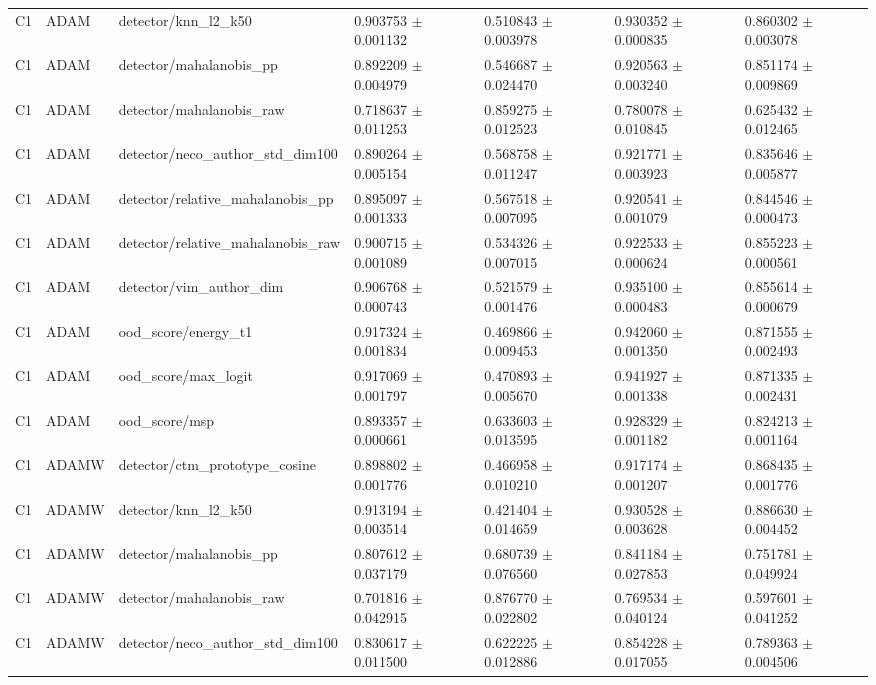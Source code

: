 \begin{longtable}{lllllll}
C1 & ADAM & detector/knn\_l2\_k50 & 0.903753 $\pm$ 0.001132 & 0.510843 $\pm$ 0.003978 & 0.930352 $\pm$ 0.000835 & 0.860302 $\pm$ 0.003078 \\
C1 & ADAM & detector/mahalanobis\_pp & 0.892209 $\pm$ 0.004979 & 0.546687 $\pm$ 0.024470 & 0.920563 $\pm$ 0.003240 & 0.851174 $\pm$ 0.009869 \\
C1 & ADAM & detector/mahalanobis\_raw & 0.718637 $\pm$ 0.011253 & 0.859275 $\pm$ 0.012523 & 0.780078 $\pm$ 0.010845 & 0.625432 $\pm$ 0.012465 \\
C1 & ADAM & detector/neco\_author\_std\_dim100 & 0.890264 $\pm$ 0.005154 & 0.568758 $\pm$ 0.011247 & 0.921771 $\pm$ 0.003923 & 0.835646 $\pm$ 0.005877 \\
C1 & ADAM & detector/relative\_mahalanobis\_pp & 0.895097 $\pm$ 0.001333 & 0.567518 $\pm$ 0.007095 & 0.920541 $\pm$ 0.001079 & 0.844546 $\pm$ 0.000473 \\
C1 & ADAM & detector/relative\_mahalanobis\_raw & 0.900715 $\pm$ 0.001089 & 0.534326 $\pm$ 0.007015 & 0.922533 $\pm$ 0.000624 & 0.855223 $\pm$ 0.000561 \\
C1 & ADAM & detector/vim\_author\_dim & 0.906768 $\pm$ 0.000743 & 0.521579 $\pm$ 0.001476 & 0.935100 $\pm$ 0.000483 & 0.855614 $\pm$ 0.000679 \\
C1 & ADAM & ood\_score/energy\_t1 & 0.917324 $\pm$ 0.001834 & 0.469866 $\pm$ 0.009453 & 0.942060 $\pm$ 0.001350 & 0.871555 $\pm$ 0.002493 \\
C1 & ADAM & ood\_score/max\_logit & 0.917069 $\pm$ 0.001797 & 0.470893 $\pm$ 0.005670 & 0.941927 $\pm$ 0.001338 & 0.871335 $\pm$ 0.002431 \\
C1 & ADAM & ood\_score/msp & 0.893357 $\pm$ 0.000661 & 0.633603 $\pm$ 0.013595 & 0.928329 $\pm$ 0.001182 & 0.824213 $\pm$ 0.001164 \\
C1 & ADAMW & detector/ctm\_prototype\_cosine & 0.898802 $\pm$ 0.001776 & 0.466958 $\pm$ 0.010210 & 0.917174 $\pm$ 0.001207 & 0.868435 $\pm$ 0.001776 \\
C1 & ADAMW & detector/knn\_l2\_k50 & 0.913194 $\pm$ 0.003514 & 0.421404 $\pm$ 0.014659 & 0.930528 $\pm$ 0.003628 & 0.886630 $\pm$ 0.004452 \\
C1 & ADAMW & detector/mahalanobis\_pp & 0.807612 $\pm$ 0.037179 & 0.680739 $\pm$ 0.076560 & 0.841184 $\pm$ 0.027853 & 0.751781 $\pm$ 0.049924 \\
C1 & ADAMW & detector/mahalanobis\_raw & 0.701816 $\pm$ 0.042915 & 0.876770 $\pm$ 0.022802 & 0.769534 $\pm$ 0.040124 & 0.597601 $\pm$ 0.041252 \\
C1 & ADAMW & detector/neco\_author\_std\_dim100 & 0.830617 $\pm$ 0.011500 & 0.622225 $\pm$ 0.012886 & 0.854228 $\pm$ 0.017055 & 0.789363 $\pm$ 0.004506 \\

\end{longtable}
